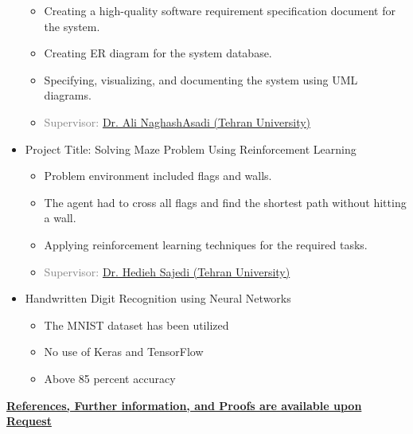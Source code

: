 \documentclass[11pt,a4paper,sans]{moderncv} %
\begin{document}
\begin{itemize}
            \begin{itemize}
                \item Creating a high-quality software requirement specification document for the system.
                \item Creating ER diagram for the system database.
                \item Specifying, visualizing, and documenting the system using UML diagrams.
                \item \textcolor{gray}{Supervisor: \href{https://profile.ut.ac.ir/en/~naghashasadi}{Dr. Ali NaghashAsadi  (Tehran University)}}
            \end{itemize}
        \vspace{0.5em}
	\item Project Title: Solving Maze Problem Using Reinforcement Learning
    	\begin{itemize}
    		\item Problem environment included flags and walls.
    		\item The agent had to cross all flags and find the shortest path without hitting a wall.
    		\item Applying reinforcement learning techniques for the required tasks.
    		\item \textcolor{gray}{Supervisor: \href{https://profile.ut.ac.ir/en/~hhsajedi}{Dr. Hedieh Sajedi  (Tehran University)}}
    	\end{itemize}
        \vspace{0.5em}
        \item Handwritten Digit Recognition using Neural Networks
    	\begin{itemize}
    		\item The MNIST dataset has been utilized
    		\item No use of Keras and TensorFlow
    		\item Above 85 percent accuracy
    	\end{itemize}

    \end{itemize}

    

	
\vspace{2.0em}

\centerline{\underline{\textbf{	\faExclamationCircle \hspace{0.5 pt} References, Further information, and Proofs are available upon Request}}}
  
\end{document}
